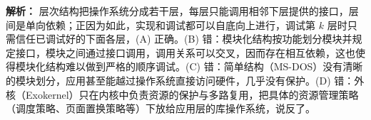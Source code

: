 \begin{enumerate}[resume]
\ifshowsolutions\par\noindent\textbf{解析：} 层次结构把操作系统分成若干层，每层只能调用相邻下层提供的接口，层间是单向依赖；正因为如此，实现和调试都可以自底向上进行，调试第 $k$ 层时只需信任已调试好的下面各层，(A) 正确。(B) 错：模块化结构按功能划分模块并规定接口，模块之间通过接口调用，调用关系可以交叉，因而存在相互依赖，这也使得模块化结构难以做到严格的顺序调试。(C) 错：简单结构（MS-DOS）没有清晰的模块划分，应用甚至能越过操作系统直接访问硬件，几乎没有保护。(D) 错：外核（Exokernel）只在内核中负责资源的保护与多路复用，把具体的资源管理策略（调度策略、页面置换策略等）下放给应用层的库操作系统，说反了。\else \answerarea \fi

\end{enumerate}

\vspace{8pt}
